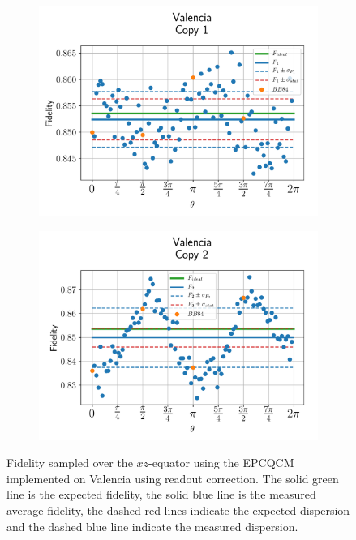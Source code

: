 \begin{figure}[H]
  \centering
  \begin{subfigure}{.5\textwidth}
    \centering
    \includegraphics[width=\textwidth]{Figures/Economical/IBM/OnlyEquator/results_valencia_copy1.png}
    \label{fig:epc_uncorrected_valencia_equator_1}
  \end{subfigure}%
  \begin{subfigure}{.5\textwidth}
    \centering
    \includegraphics[width=\textwidth]{Figures/Economical/IBM/OnlyEquator/results_valencia_copy2.png}
    \label{fig:epc_uncorrected_valencia_equator_2}
  \end{subfigure}
  \vspace{-0.5cm}
  \caption{Fidelity sampled over the $xz$-equator using the EPCQCM implemented on Valencia using readout correction. The solid green line is the expected fidelity, the solid blue line is the measured average fidelity, the dashed red lines indicate the expected dispersion and the dashed blue line indicate the measured dispersion.}
  \label{fig:epc_uncorrected_valencia_equator}
\end{figure}

